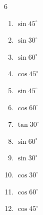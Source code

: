 \begin{multicols}{6}
\begin{enumerate}
  \item $\displaystyle \sin{45^\circ}$


  \item $\displaystyle \sin{30^\circ}$


  \item $\displaystyle \sin{60^\circ}$


  \item $\displaystyle \cos{45^\circ}$


  \item $\displaystyle \sin{45^\circ}$


  \item $\displaystyle \cos{60^\circ}$


\columnbreak %

  \item $\displaystyle \tan{30^\circ}$


  \item $\displaystyle \sin{60^\circ}$


  \item $\displaystyle \sin{30^\circ}$


  \item $\displaystyle \cos{30^\circ}$


  \item $\displaystyle \cos{60^\circ}$


  \item $\displaystyle \cos{45^\circ}$



\end{enumerate}
\end{multicols}
